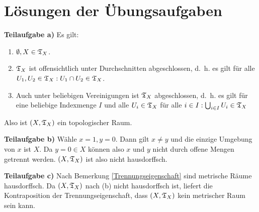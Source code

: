 \chapter*{Lösungen der Übungsaufgaben}
\begin{solution}[\ref{ub1:aufg1}]
    \textbf{Teilaufgabe a)} Es gilt:
    \begin{enumerate}[label=(\roman*)]
        \item $\emptyset, X \in \mathfrak{T}_X$.
        \item $\mathfrak{T}_X$ ist offensichtlich unter Durchschnitten abgeschlossen,
              d.~h. es gilt für alle $U_1, U_2 \in \mathfrak{T}_X: U_1 \cap U_2 \in \mathfrak{T}_X$.
        \item Auch unter beliebigen Vereinigungen ist $\mathfrak{T}_X$ abgeschlossen,
              d.~h. es gilt für eine beliebige Indexmenge $I$ und alle
              $U_i \in \mathfrak{T}_X$ für alle $i \in I: \bigcup_{i \in I} U_i \in \mathfrak{T}_X$
    \end{enumerate}

    Also ist $(X, \mathfrak{T}_X)$ ein topologischer Raum.

    \textbf{Teilaufgabe b)} Wähle $x=1, y=0$. Dann gilt $x \neq y$
    und die einzige Umgebung von $x$ ist $X$. Da $y=0 \in X$ können
    also $x$ und $y$ nicht durch offene Mengen getrennt werden.
    $(X, \mathfrak{T}_X)$ ist also nicht hausdorffsch.

    \textbf{Teilaufgabe c)} Nach Bemerkung \ref{Trennungseigenschaft}
    sind metrische Räume hausdorffsch. Da $(X, \mathfrak{T}_X)$ nach (b) nicht 
    hausdorffsch ist, liefert die Kontraposition der Trennungseigenschaft,
    dass $(X, \mathfrak{T}_X)$ kein metrischer Raum sein kann.
\end{solution}

